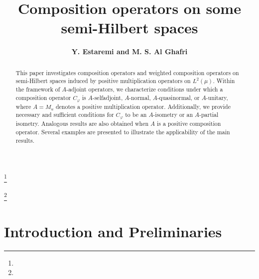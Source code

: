 \documentclass{amsart}
\theoremstyle{definition}\newtheorem{defn}[thm]{Definition}
\theoremstyle{remark}
\numberwithin{equation}{section}
\begin{document}
\title[]
{Composition operators on some semi-Hilbert spaces}

\author{\sc\bf Y. Estaremi and M. S. Al Ghafri}
\address{\sc Y. Estaremi}
\address{Department of Mathematics, Faculty of Sciences, Golestan University, Gorgan, Iran.}
\address{\sc M. S. Al Ghafri}
\address{Department of Mathematics, University of Technology and Applied Sciences, Rustaq,   Sultanate of Oman.}
\address{}
\thanks{}

\thanks{}



\date{}

\dedicatory{}

\commby{}

\begin{abstract}
This paper investigates composition operators and weighted composition operators on semi-Hilbert spaces induced by positive multiplication operators on \( L^2(\mu) \). Within the framework of \( A \)-adjoint operators, we characterize conditions under which a composition operator \( C_\varphi \) is \( A \)-selfadjoint, \( A \)-normal, \( A \)-quasinormal, or \( A \)-unitary, where \( A = M_u \) denotes a positive multiplication operator. Additionally, we provide necessary and sufficient conditions for \( C_\varphi \) to be an \( A \)-isometry or an \( A \)-partial isometry. Analogous results are also obtained when \( A \) is a positive composition operator. Several examples are presented to illustrate the applicability of the main results.
\end{abstract}



\maketitle
\section{Introduction and Preliminaries}
\end{document}
